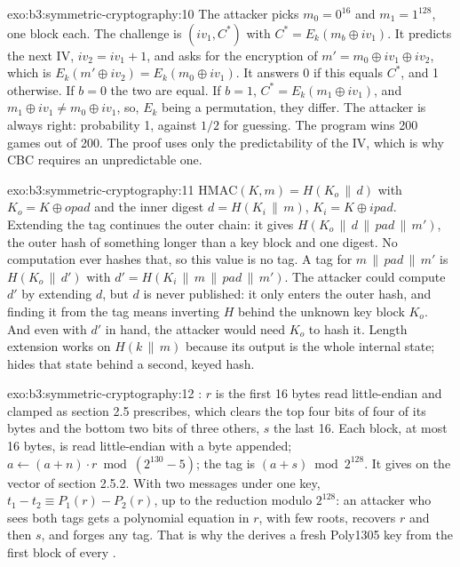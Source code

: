\begin{solution}{exo:b3:symmetric-cryptography:10}
The attacker picks $m_0 = 0^{16}$ and $m_1 = 1^{128}$, one block each. The challenge is $(\mathit{iv}_1, C^*)$ with $C^* = E_k(m_b \oplus \mathit{iv}_1)$. It predicts the next IV, $\mathit{iv}_2 = \mathit{iv}_1 + 1$, and asks for the encryption of $m' = m_0 \oplus \mathit{iv}_1 \oplus \mathit{iv}_2$, which is $E_k(m' \oplus \mathit{iv}_2) = E_k(m_0 \oplus \mathit{iv}_1)$. It answers 0 if this equals $C^*$, and 1 otherwise. If $b = 0$ the two are equal. If $b = 1$, $C^* = E_k(m_1 \oplus \mathit{iv}_1)$, and $m_1 \oplus \mathit{iv}_1 \ne m_0 \oplus \mathit{iv}_1$, so, $E_k$ being a permutation, they differ. The attacker is always right: probability 1, against $1/2$ for guessing. The program wins 200 games out of 200. The proof uses only the predictability of the IV, which is why CBC requires an unpredictable one.
\end{solution}

\begin{solution}{exo:b3:symmetric-cryptography:11}
$\mathrm{HMAC}(K, m) = H(K_o \,\|\, d)$ with $K_o = K \oplus \mathit{opad}$ and the inner digest $d = H(K_i \,\|\, m)$, $K_i = K \oplus \mathit{ipad}$. Extending the tag continues the outer chain: it gives $H(K_o \,\|\, d \,\|\, \mathit{pad} \,\|\, m')$, the outer hash of something longer than a key block and one digest. No  computation ever hashes that, so this value is no tag. A tag for $m \,\|\, \mathit{pad} \,\|\, m'$ is $H(K_o \,\|\, d')$ with $d' = H(K_i \,\|\, m \,\|\, \mathit{pad} \,\|\, m')$. The attacker could compute $d'$ by extending $d$, but $d$ is never published: it only enters the outer hash, and finding it from the tag means inverting $H$ behind the unknown key block $K_o$. And even with $d'$ in hand, the attacker would need $K_o$ to hash it. Length extension works on $H(k \,\|\, m)$ because its output is the whole internal state;  hides that state behind a second, keyed hash.
\end{solution}

\begin{solution}{exo:b3:symmetric-cryptography:12}
: $r$ is the first 16 bytes read little-endian and clamped as section 2.5 prescribes, which clears the top four bits of four of its bytes and the bottom two bits of three others, $s$ the last 16. Each block, at most 16 bytes, is read little-endian with a byte  appended; $a \leftarrow (a + n) \cdot r \bmod (2^{130} - 5)$; the tag is $(a + s) \bmod 2^{128}$. It gives  on the vector of section 2.5.2. With two messages under one key, $t_1 - t_2 \equiv P_1(r) - P_2(r)$, up to the reduction modulo $2^{128}$: an attacker who sees both tags gets a polynomial equation in $r$, with few roots, recovers $r$ and then $s$, and forges any tag. That is why the  derives a fresh Poly1305 key from the first  block of every .
\end{solution}

